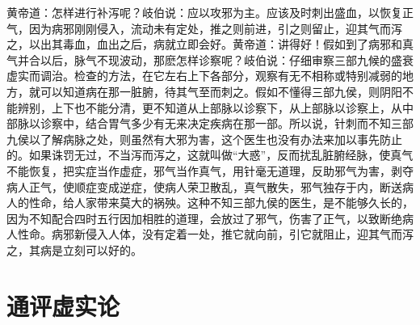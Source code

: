 \documentclass[12pt,UTF8]{ctexbook}
\begin{document}
黄帝道：怎样进行补泻呢？岐伯说：应以攻邪为主。应该及时刺出盛血，以恢复正气，因为病邪刚刚侵入，流动未有定处，推之则前进，引之则留止，迎其气而泻之，以出其毒血，血出之后，病就立即会好。黄帝道：讲得好！假如到了病邪和真气并合以后，脉气不现波动，那麽怎样诊察呢？岐伯说：仔细审察三部九候的盛衰虚实而调治。检查的方法，在它左右上下各部分，观察有无不相称或特别减弱的地方，就可以知道病在那一脏腑，待其气至而刺之。假如不懂得三部九侯，则阴阳不能辨别，上下也不能分清，更不知道从上部脉以诊察下，从上部脉以诊察上，从中部脉以诊察中，结合胃气多少有无来决定疾病在那一部。所以说，针刺而不知三部九侯以了解病脉之处，则虽然有大邪为害，这个医生也没有办法来加以事先防止的。如果诛罚无过，不当泻而泻之，这就叫做“大惑”，反而扰乱脏腑经脉，使真气不能恢复，把实症当作虚症，邪气当作真气，用针毫无道理，反助邪气为害，剥夺病人正气，使顺症变成逆症，使病人荣卫散乱，真气散失，邪气独存于内，断送病人的性命，给人家带来莫大的祸殃。这种不知三部九侯的医生，是不能够久长的，因为不知配合四时五行因加相胜的道理，会放过了邪气，伤害了正气，以致断绝病人性命。病邪新侵入人体，没有定着一处，推它就向前，引它就阻止，迎其气而泻之，其病是立刻可以好的。

\chapter{通评虚实论}
\end{document}
